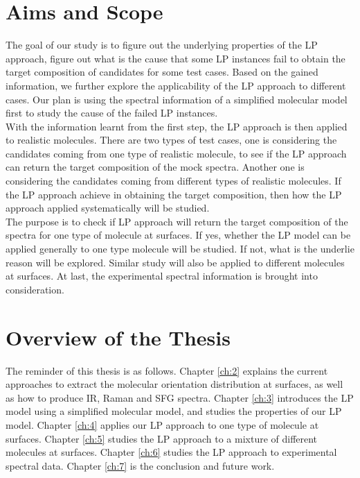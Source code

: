 \section{Aims and Scope}
The goal of our study is to figure out the underlying properties of the LP approach, figure out what is the cause that some LP instances fail to obtain the target composition of candidates for some test cases. Based on the gained information, we further explore the applicability of the LP approach to different cases. Our plan is using the spectral information of a simplified molecular model first to study the cause of the failed LP instances. \\

With the information learnt from the first step, the LP approach is then applied to realistic molecules. There are two types of test cases, one is considering the candidates coming from one type of realistic molecule, to see if the LP approach can return the target composition of the mock spectra. Another one is considering the candidates coming from different types of realistic molecules. If the LP approach achieve in obtaining the target composition, then how the LP approach applied systematically will be studied. \\

The purpose is to check if LP approach will return the target composition of the spectra for one type of molecule at surfaces. If yes, whether the LP model can be applied generally to one type molecule will be studied. If not, what is the underlie reason will be explored. Similar study will also be applied to different molecules at surfaces. At last, the experimental spectral information is brought into consideration. \\

\section{Overview of the Thesis}
The reminder of this thesis is as follows. Chapter \ref{ch:2} explains the current approaches to extract the molecular orientation distribution at surfaces, as well as how to produce IR, Raman and SFG spectra. Chapter \ref{ch:3} introduces the LP model using a simplified molecular model, and studies the properties of our LP model. Chapter \ref{ch:4} applies our LP approach to one type of molecule at surfaces. Chapter \ref{ch:5} studies the LP approach to a mixture of different molecules at surfaces. Chapter \ref{ch:6} studies the LP approach to experimental spectral data. Chapter \ref{ch:7} is the conclusion and future work.
